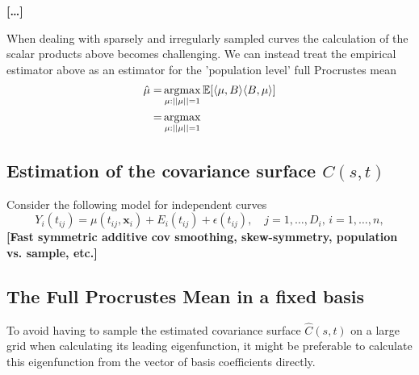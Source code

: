 \textbf{[\dots]}

When dealing with sparsely and irregularly sampled curves the calculation of the scalar products above becomes challenging.
We can instead treat the empirical estimator above as an estimator for the 'population level' full Procrustes mean
\begin{align*}
\hat{\mu} =& \operatorname*{argmax}_{\mu:||\mu||=1} \mathbb{E}[\langle \mu, B \rangle \langle B,\mu \rangle]\\
  =& \operatorname*{argmax}_{\mu:||\mu||=1}
\end{align*}

\subsection{Estimation of the covariance surface $C(s,t)$}
Consider the following model for independent curves
\begin{equation}
  Y_i(t_{ij}) = \mu(t_{ij}, \mathbf{x}_i) + E_i(t_{ij}) + \epsilon(t_{ij}),
    \quad j = 1,\dots,D_i, \, i = 1,\dots,n,
\end{equation}
\textbf{[Fast symmetric additive cov smoothing, skew-symmetry, population vs. sample, etc.]}

\newpage
\subsection{The Full Procrustes Mean in a fixed basis}
To avoid having to sample the estimated covariance surface $\hat{C}(s,t)$ on a large grid when calculating its leading eigenfunction, it might be preferable to calculate this eigenfunction from the vector of basis coefficients directly.

